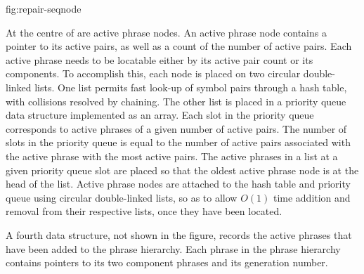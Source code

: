 {fig:repair-seqnode}

At the centre of  are active phrase
nodes.  An active phrase node contains a pointer to its active
pairs, as well as a count of the number of active pairs.  Each
active phrase needs to be locatable either by its
active pair count or its components.  To accomplish this, each 
node is placed on two circular double-linked lists.  One
list permits fast look-up of symbol pairs through a hash table,
with collisions resolved by chaining.  The other list is placed in
a priority queue data structure implemented as an array.  Each slot 
in the priority queue corresponds to active phrases of a given number
of active pairs.  The number of slots in the priority queue 
is equal to the number of active pairs associated with the active
phrase with the most active pairs.
The active phrases in a list at a given priority
queue slot are placed so that the oldest active phrase node is at
the head of the list.  Active phrase nodes are attached to the 
hash table and priority queue using circular double-linked lists, 
so as to allow $O(1)$ time addition and removal from their respective 
lists, once they have been located.

A fourth data structure, not shown in the figure, records 
the active phrases that have been 
added to the phrase hierarchy.  Each phrase in the 
phrase hierarchy contains pointers to its two component phrases
and its generation number.


